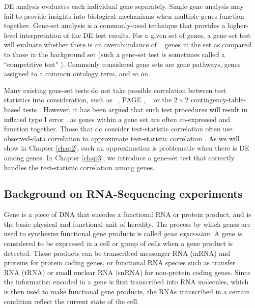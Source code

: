 DE analysis evaluates each individual gene separately. Single-gene analysis
may fail to provide insights into biological mechanisms when multiple genes
function together.  Gene-set analysis is a commonly-used technique that
provides a higher-level interpretation of the DE test results. For a given set
of genes, a gene-set test will evaluate whether there is an overabundance of \DED~
genes in the set as compared to those in the background set (such a
gene-set test is sometimes called a ``competitive test" 
\citep{goeman2007analyzing}). Commonly considered gene sets are gene pathways, genes assigned to a 
common ontology term, and so on.

Many existing gene-set tests do not take possible correlation between test
statistics into consideration, such as \gent~\citep{tian2005discovering}, PAGE
\citep{kim2005page}, \genr~\citep{michaud2008integrative} or the $2\times 2$ contingency-table-based
tests \cite{alexa2010topgo, huang2007david,ye2006wego}. However, it has been argued that such test
procedures will result in inflated type I error 
\citep{efron2007testing,gatti2010heading,goeman2007analyzing,wu2012camera,yaari2013quantitative}, 
as genes within a gene set are often co-expressed and function together. Those that do consider 
test-statistic correlation often use 
observed-data correlation to approximate test-statistic correlation 
\citep{barry2008statistical,wu2012camera,yaari2013quantitative}. As we will show in
Chapter \ref{chap2}, such an approximation is problematic when there is DE among genes. In
Chapter \ref{chap3}, we introduce a gene-set test that correctly handles the
test-statistic correlation among genes. 



\subsection{Background on RNA-Sequencing experiments}\label{subsec:RNABackground}

Gene is a piece of DNA that encodes a functional RNA or protein product, and is the basic physical
and functional unit of heredity. The process by which genes are used to synthesize functional gene
products is called \textit{gene expression}.  A gene is considered to be expressed in a cell or
group of cells when a gene product is detected.
These products can be transcribed messenger RNA (mRNA) and proteins for protein coding genes, or
functional RNA species such as transfer RNA (tRNA) or small nuclear RNA (snRNA) for non-protein
coding genes.
Since the information encoded in a gene is first transcribed into RNA molecules, which is then used
to make functional gene products, the RNAs transcribed
in a certain condition reflect the current state of the cell.

